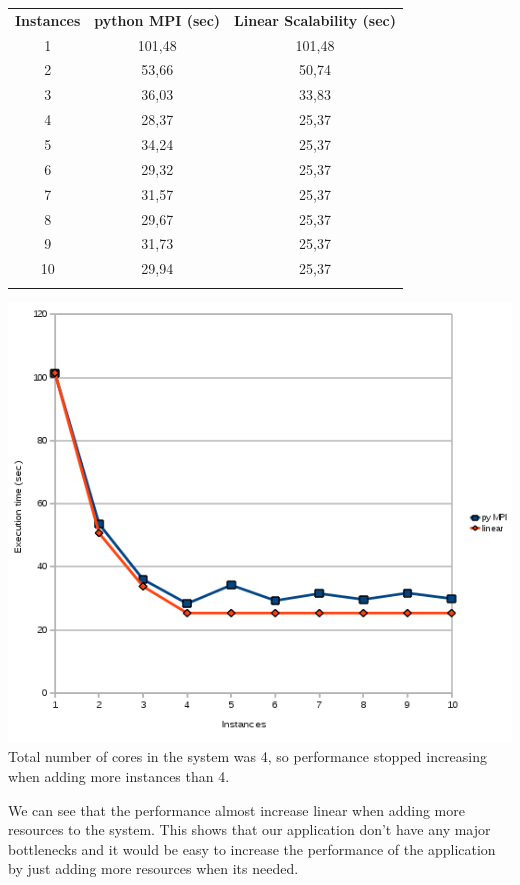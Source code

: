 \documentclass{article}
\begin{document}
{
\begin{tabular}{c c c}
  \rowcolor[gray]{0.5}
  {\bf Instances} & {\bf python MPI (sec)} & {\bf Linear Scalability (sec)} \\
  1 & 101,48 & 101,48 \\
  2 & 53,66  & 50,74  \\
  3 & 36,03  & 33,83  \\
  4 & 28,37  & 25,37  \\
  5 & 34,24  & 25,37  \\
  6 & 29,32  & 25,37  \\
  7 & 31,57  & 25,37  \\
  8 & 29,67  & 25,37  \\
  9 & 31,73  & 25,37  \\
 10 & 29,94  & 25,37  \\
\rowcolor[gray]{0.5}
\end{tabular}

\includegraphics[width=\textwidth]{img/scalabilty-pympi.png}
\\\small{ Total number of cores in the system was 4, so performance stopped
increasing when adding more instances than 4. }

We can see that the performance almost increase linear when adding more
resources to the system. This shows that our application don't have any
major bottlenecks and it would be easy to increase the performance
of the application by just adding more resources when its needed.

}
\end{document}
